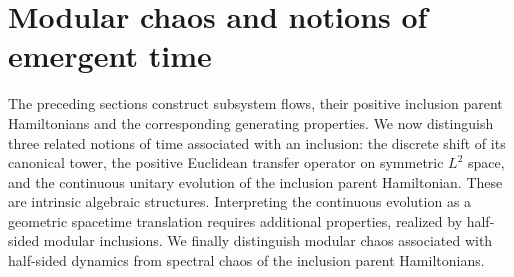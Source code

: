 \documentclass[a4paper,11pt]{article}
\theoremstyle{definition}
\begin{document}


\section{Modular chaos and notions of emergent time}
\label{sec:emergent-time}

The preceding sections construct subsystem flows, their positive inclusion
parent Hamiltonians and the corresponding generating properties.  We now
distinguish three related notions of time associated with an inclusion:
the discrete shift of its canonical tower, the positive Euclidean transfer
operator on symmetric $L^2$ space, and the continuous unitary evolution of
the inclusion parent Hamiltonian.  These are intrinsic algebraic structures.
Interpreting the continuous evolution as a geometric spacetime translation
requires additional properties, realized by half-sided modular inclusions.
We finally distinguish modular chaos associated with half-sided dynamics
from spectral chaos of the inclusion parent Hamiltonians.
\end{document}
